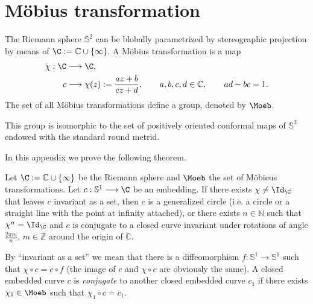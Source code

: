 





\section{M\"obius transformation}\label{app:A}

The Riemann sphere $\mathbb{S}^2$ can be blobally
parametrized by stereographic projection by means of $\C:=\mathbb{C} \cup
\{ \infty \}$. A M\"obius transformation is a map 
\begin{align*}
\chi: \C & \longrightarrow \C, \\
c & \longrightarrow \chi(z) := \frac{a z + b}{c z + d}, \quad \quad
a,b,c,d \in \mathbb{C}, \quad \quad ad-bc = 1.
\end{align*}
The set of all M\"obius transformations define a group, denoted by $\Moeb$.


This group is isomorphic to the set of positively oriented conformal maps of 
$\mathbb{S}^2$ endowed with the standard round metrid.


In this appendix we prove the following theorem. 
\begin{thm}
\label{InvThm}
Let $\C := \mathbb{C} \cup \{ \infty \}$ be the Riemann sphere and 
$\Moeb$ 
the set of M\"obieus transformations. Let 
$c: \mathbb{S}^1 \longrightarrow \C$ be an embedding.
If there exists $\chi \neq \Id_{\C}$ that leaves $c$ invariant as a 
set, then $c$ is a generalized circle (i.e. a circle or a straight line with the 
point at infinity attached), or there exists $n \in \mathbb{N}$ such that
$\chi^n = \Id_{\C}$ and $c$ is conjugate to a closed curve invariant
under rotations of angle $\frac{2\pi m}{n}$, $m \in \mathbb{Z}$ around the
origin of $\mathbb{C}$.
\end{thm}

By ``invariant as a set'' we mean that there is a diffeomorphism
$f : \mathbb{S}^1 \longrightarrow \mathbb{S}^1$ such that
$\chi \circ c = c \circ f$ (the image of $c$ and $\chi \circ c$
are obviously the same).
A closed embedded curve $c$ is {\it conjugate} to another
closed embedded curve $c_1$ if there exists $\chi_1 \in \Moeb$ such that
$\chi_1 \circ c = c_1$.

\vspace{3mm}

